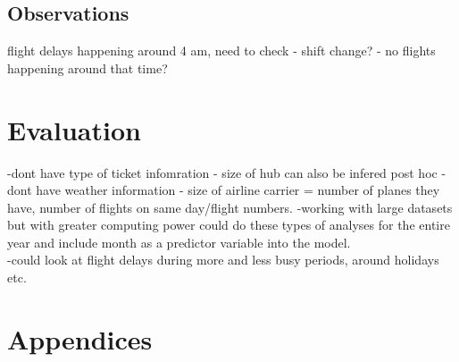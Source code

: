 \documentclass[a4paper, 11pt]{article}
\begin{document}
\subsection{Observations}
flight delays happening around 4 am, need to check
- shift change?
- no flights happening around that time?

\section{Evaluation}
-dont have type of ticket infomration
- size of hub can also be infered post hoc
- dont have weather information
- size of airline carrier = number of planes they have, number of flights on same day/flight numbers.
-working with large datasets but with greater computing power could do these types of analyses for the entire year and include month as a predictor variable into the model.\\
-could look at flight delays during more and less busy periods, around holidays etc.\\



\clearpage
\begin{thebibliography}{100}
\end{thebibliography}

\newpage
\section*{Appendices}
\end{document}
